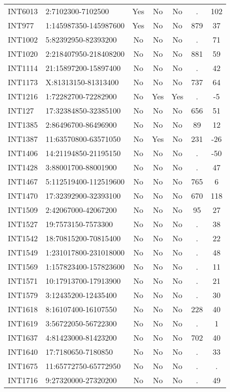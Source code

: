 \begin{longtable}{llccccc}
INT6013 & 2:7102300-7102500 & Yes & No & No & . & 102 \\
INT977 & 1:145987350-145987600 & Yes & No & No & 879 & 37 \\
INT1002 & 5:82392950-82393200 & No & No & No & . & 71 \\
INT1020 & 2:218407950-218408200 & No & No & No & 881 & 59 \\
INT1114 & 21:15897200-15897400 & No & No & No & . & 42 \\
INT1173 & X:81313150-81313400 & No & No & No & 737 & 64 \\
INT1216 & 1:72282700-72282900 & No & Yes & Yes & . & -5 \\
INT127 & 17:32384850-32385100 & No & No & No & 656 & 51 \\
INT1385 & 2:86496700-86496900 & No & No & No & 89 & 12 \\
INT1387 & 11:63570800-63571050 & No & Yes & No & 231 & -26 \\
INT1406 & 14:21194850-21195150 & No & No & No & . & -50 \\
INT1428 & 3:88001700-88001900 & No & No & No & . & 47 \\
INT1467 & 5:112519400-112519600 & No & No & No & 765 & 6 \\
INT1470 & 17:32392900-32393100 & No & No & No & 670 & 118 \\
INT1509 & 2:42067000-42067200 & No & No & No & 95 & 27 \\
INT1527 & 19:7573150-7573300 & No & No & No & . & 38 \\
INT1542 & 18:70815200-70815400 & No & No & No & . & 22 \\
INT1549 & 1:231017800-231018000 & No & No & No & . & 48 \\
INT1569 & 1:157823400-157823600 & No & No & No & . & 11 \\
INT1571 & 10:17913700-17913900 & No & No & No & . & 21 \\
INT1579 & 3:12435200-12435400 & No & No & No & . & 30 \\
INT1618 & 8:16107400-16107550 & No & No & No & 228 & 40 \\
INT1619 & 3:56722050-56722300 & No & No & No & . & 1 \\
INT1637 & 4:81423000-81423200 & No & No & No & 702 & 40 \\
INT1640 & 17:7180650-7180850 & No & No & No & . & 33 \\
INT1675 & 11:65772750-65772950 & No & No & No & . & . \\
INT1716 & 9:27320000-27320200 & No & No & No & . & 49 \\

\end{longtable}
